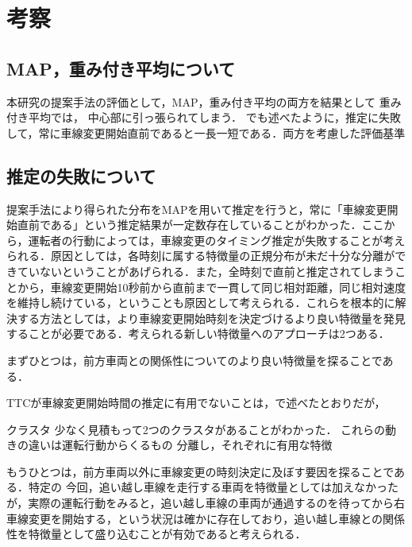 \chapter{考察}
\section{MAP，重み付き平均について}
本研究の提案手法の評価として，MAP，重み付き平均の両方を結果として
重み付き平均では，
中心部に引っ張られてしまう．
でも述べたように，推定に失敗して，常に車線変更開始直前であると一長一短である．両方を考慮した評価基準
\section{推定の失敗について}
提案手法により得られた分布をMAPを用いて推定を行うと，常に「車線変更開始直前である」という推定結果が一定数存在していることがわかった．ここから，運転者の行動によっては，車線変更のタイミング推定が失敗することが考えられる．原因としては，各時刻に属する特徴量の正規分布が未だ十分な分離ができていないということがあげられる．また，全時刻で直前と推定されてしまうことから，車線変更開始10秒前から直前まで一貫して同じ相対距離，同じ相対速度を維持し続けている，ということも原因として考えられる．これらを根本的に解決する方法としては，より車線変更開始時刻を決定づけるより良い特徴量を発見することが必要である．考えられる新しい特徴量へのアプローチは2つある．
\par
まずひとつは，前方車両との関係性についてのより良い特徴量を探ることである．

TTCが車線変更開始時間の推定に有用でないことは，で述べたとおりだが，



クラスタ
少なく見積もって2つのクラスタがあることがわかった．
これらの動きの違いは運転行動からくるもの
分離し，それぞれに有用な特徴

\par
もうひとつは，前方車両以外に車線変更の時刻決定に及ぼす要因を探ることである．特定の
今回，追い越し車線を走行する車両を特徴量としては加えなかったが，実際の運転行動をみると，追い越し車線の車両が通過するのを待ってから右車線変更を開始する，という状況は確かに存在しており，追い越し車線との関係性を特徴量として盛り込むことが有効であると考えられる．
